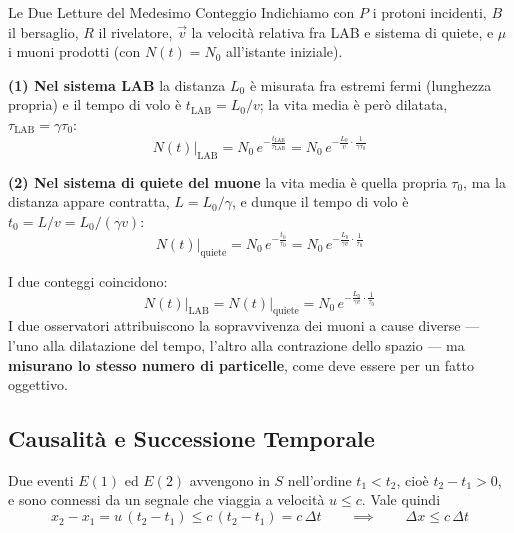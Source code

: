 \begin{esempio}{Le Due Letture del Medesimo Conteggio}
Indichiamo con $P$ i protoni incidenti, $B$ il bersaglio, $R$ il rivelatore, $\vec{v}$ la velocità relativa fra LAB e sistema di quiete, e $\mu$ i muoni prodotti (con $N(t) = N_0$ all'istante iniziale).

\textbf{(1) Nel sistema LAB} la distanza $L_0$ è misurata fra estremi fermi (lunghezza propria) e il tempo di volo è $t_{\text{LAB}} = L_0/v$; la vita media è però dilatata, $\tau_{\text{LAB}} = \gamma \tau_0$:
\begin{equation}
    N(t)\big|_{\text{LAB}} = N_0 \, e^{-\frac{t_{\text{LAB}}}{\tau_{\text{LAB}}}}
    = N_0 \, e^{-\frac{L_0}{v} \cdot \frac{1}{\gamma \tau_0}}
\end{equation}

\textbf{(2) Nel sistema di quiete del muone} la vita media è quella propria $\tau_0$, ma la distanza appare contratta, $L = L_0/\gamma$, e dunque il tempo di volo è $t_0 = L/v = L_0/(\gamma v)$:
\begin{equation}
    N(t)\big|_{\text{quiete}} = N_0 \, e^{-\frac{t_0}{\tau_0}}
    = N_0 \, e^{-\frac{L_0}{\gamma v} \cdot \frac{1}{\tau_0}}
\end{equation}

I due conteggi coincidono:
\begin{equation}
    \boxed{\;N(t)\big|_{\text{LAB}} = N(t)\big|_{\text{quiete}} = N_0 \, e^{-\frac{L_0}{\gamma v}\cdot\frac{1}{\tau_0}}\;}
\end{equation}
I due osservatori attribuiscono la sopravvivenza dei muoni a cause diverse --- l'uno alla dilatazione del tempo, l'altro alla contrazione dello spazio --- ma \textbf{misurano lo stesso numero di particelle}, come deve essere per un fatto oggettivo.
\end{esempio}

\subsection{Causalità e Successione Temporale}

Due eventi $E(1)$ ed $E(2)$ avvengono in $S$ nell'ordine $t_1 < t_2$, cioè $t_2 - t_1 > 0$, e sono connessi da un segnale che viaggia a velocità $u \leq c$. Vale quindi
\begin{equation}
    x_2 - x_1 = u\,(t_2 - t_1) \leq c\,(t_2-t_1) = c\,\Delta t
    \qquad \implies \qquad \Delta x \leq c\,\Delta t
\end{equation}

